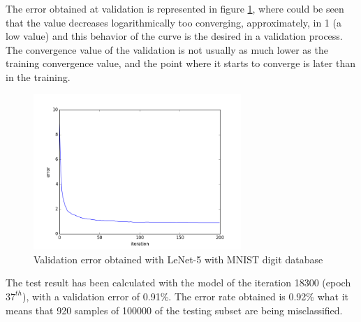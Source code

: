 The error obtained at validation is represented in figure \ref{fig:Lenetresult}, where could be seen that the value decreases logarithmically too converging, approximately, in 1 (a low value) and this behavior of the curve is the desired in a validation process. The convergence value of the validation is not usually as much lower as the training convergence value, and the point where it starts to converge is later than in the training.\\

\begin{figure}[htb]
\centering
\includegraphics[width=0.7\textwidth]{images/ModificandoLenet/error_lenet.png}
\caption{Validation error obtained with LeNet-5 with MNIST digit database} \label{fig:Lenetresult}
\end{figure}

The test result has been calculated with the model of the iteration 18300 (epoch $37^{th}$), with a validation error of 0.91\%. The error rate obtained is 0.92\% what it means that 920 samples of 100000 of the testing subset are being misclassified.\\


